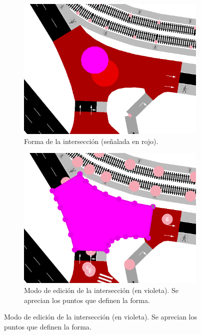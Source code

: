\begin{figure}[ht]
    \centering
    \begin{subfigure}[t]{.30\textwidth}
      \centering
      \includegraphics[width=\textwidth]{report/images/interseccion1.png}
      \caption{Forma de la intersección (señalada en rojo).}
      \label{fig:interseccion1}
    \end{subfigure}
    \hfill
    \begin{subfigure}[t]{.30\textwidth}
      \centering
      \includegraphics[width=\textwidth]{report/images/interseccion2.png}
      \caption{Modo de edición de la intersección (en violeta). Se aprecian los puntos que definen la forma.}
      \label{fig:interseccion2}

\end{subfigure}
\end{figure}
